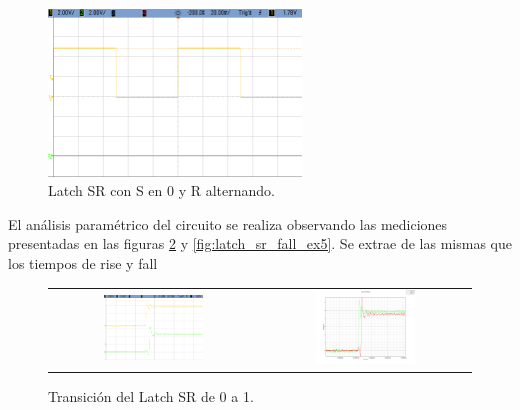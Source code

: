 \begin{figure}[H]
    \centering
    \includegraphics[width=0.6\textwidth]{../EJ6/Recursos/latch_sr_low}
    \caption{Latch SR con S en 0 y R alternando.}
    \label{fig:latch_sr_low_ex5}
\end{figure}

El análisis paramétrico del circuito se realiza observando las mediciones presentadas en las figuras \ref{fig:latch_sr_rise_ex5} y \ref{fig:latch_sr_fall_ex5}.
Se extrae de las mismas que los tiempos de rise y fall

\begin{figure}[H]
    \centering
    \begin{tabular}{c c}
        \includegraphics[width=0.5\textwidth]{../EJ6/Recursos/latch_sr_rise_osc} &
        \includegraphics[width=0.5\textwidth]{../EJ6/Recursos/latch_sr_rise}
    \end{tabular}
    \caption{Transición del Latch SR de 0 a 1.}
    \label{fig:latch_sr_rise_ex5}
\end{figure}

